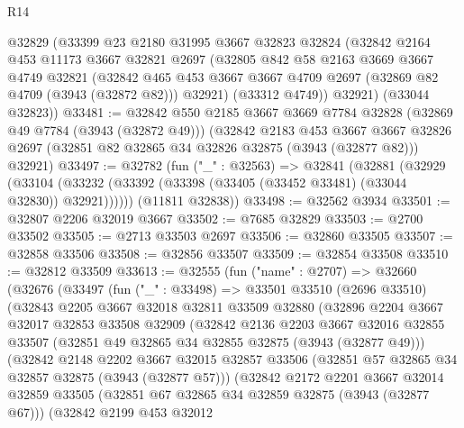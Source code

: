 \begin{lexlean}{R14}
\begin{coremodule}
    @32829
    (@33399
      @23
      @2180
      @31995
      @3667
      @32823
      @32824
      (@32842
        @2164
        @453
        @11173
        @3667
        @32821
        @2697
        (@32805
          @842
          @58
          @2163
          @3669
          @3667
          @4749
          @32821
          (@32842 @465 @453 @3667 @3667 @4709 @2697 (@32869 @82 @4709 (@3943 (@32872 @82))) @32921)
          (@33312 @4749))
        @32921)
      (@33044 @32823))
@33481 := @32842
    @550
    @2185
    @3667
    @3669
    @7784
    @32828
    (@32869 @49 @7784 (@3943 (@32872 @49)))
    (@32842
      @2183
      @453
      @3667
      @3667
      @32826
      @2697
      (@32851 @82 @32865 @34 @32826 @32875 (@3943 (@32877 @82)))
      @32921)
@33497 := @32782
    (fun ("_" : @32563) =>
    @32841
      (@32881
        (@32929
          (@33104 (@33232 (@33392 (@33398 (@33405 (@33452 @33481) (@33044 @32830)) @32921))))))
      (@11811 @32838))
@33498 := @32562 @3934
@33501 := @32807 @2206 @32019 @3667
@33502 := @7685 @32829
@33503 := @2700 @33502
@33505 := @2713 @33503 @2697
@33506 := @32860 @33505
@33507 := @32858 @33506
@33508 := @32856 @33507
@33509 := @32854 @33508
@33510 := @32812 @33509
@33613 := @32555
    (fun ("name" : @2707) =>
    @32660
      (@32676
        (@33497
          (fun ("_" : @33498) =>
          @33501
            @33510
            (@2696 @33510)
            (@32843
              @2205
              @3667
              @32018
              @32811
              @33509
              @32880
              (@32896
                @2204
                @3667
                @32017
                @32853
                @33508
                @32909
                (@32842
                  @2136
                  @2203
                  @3667
                  @32016
                  @32855
                  @33507
                  (@32851 @49 @32865 @34 @32855 @32875 (@3943 (@32877 @49)))
                  (@32842
                    @2148
                    @2202
                    @3667
                    @32015
                    @32857
                    @33506
                    (@32851 @57 @32865 @34 @32857 @32875 (@3943 (@32877 @57)))
                    (@32842
                      @2172
                      @2201
                      @3667
                      @32014
                      @32859
                      @33505
                      (@32851 @67 @32865 @34 @32859 @32875 (@3943 (@32877 @67)))
                      (@32842
                        @2199
                        @453
                        @32012

\end{coremodule}
\end{lexlean}
